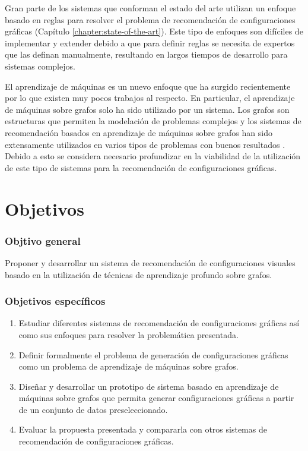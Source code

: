 Gran parte de los sistemas que conforman el estado del arte utilizan
un enfoque basado en reglas para resolver el problema de recomendaci\'on
de configuraciones gr\'aficas (Cap\'itulo \ref{chapter:state-of-the-art}).
Este tipo de enfoques son dif\'iciles de implementar y extender debido
a que para definir reglas se necesita de expertos que las
definan manualmente, resultando en largos tiempos de desarrollo para sistemas complejos.

El aprendizaje de m\'aquinas es un nuevo enfoque que ha surgido
recientemente por lo que existen muy pocos trabajos al respecto. 
En particular,
el aprendizaje de m\'aquinas sobre grafos solo ha sido utilizado por un
sistema. 
Los grafos son estructuras que permiten la modelaci\'on
de problemas complejos y los
sistemas de recomendaci\'on basados en aprendizaje de m\'aquinas
sobre grafos han sido extensamente utilizados en varios tipos de problemas con buenos resultados \cite{guo2020survey}.
Debido a esto se considera necesario profundizar en la viabilidad de la utilizaci\'on
de este tipo de sistemas para la recomendaci\'on de configuraciones gr\'aficas.
\section*{Objetivos}

\subsubsection{Objtivo general}
Proponer y desarrollar un sistema de recomendaci\'on de configuraciones
visuales basado en la utilizaci\'on de t\'ecnicas de aprendizaje profundo
sobre grafos.

\subsubsection{Objetivos espec\'ificos}
\begin{enumerate}
   \item Estudiar diferentes sistemas de recomendaci\'on de configuraciones
   gr\'aficas as\'i como sus enfoques para resolver la problem\'atica presentada.
    
    \item Definir formalmente el problema de generaci\'on de configuraciones
    gr\'aficas como un problema de aprendizaje de m\'aquinas sobre grafos.

    \item Dise\~nar y desarrollar un prototipo de sistema basado en aprendizaje de m\'aquinas sobre grafos que permita generar configuraciones
    gr\'aficas a partir de un conjunto de datos preseleccionado.

    \item Evaluar la propuesta presentada y compararla con otros sistemas de
    recomendaci\'on de configuraciones gr\'aficas.

\end{enumerate}



